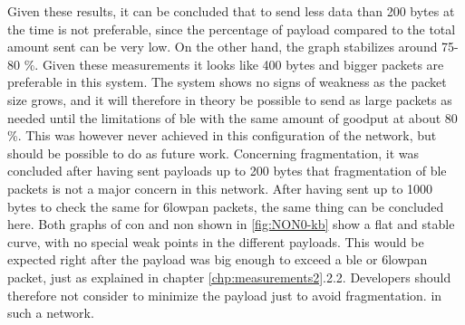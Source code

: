 \noindent Given these results, it can be concluded that to send less data than 200 bytes at the time is not preferable, since the percentage of \gls{payload} compared to the total amount sent can be very low. On the other hand, the graph stabilizes around 75-80 \%. Given these measurements it looks like 400 bytes and bigger packets are preferable in this system. The system shows no signs of weakness as the packet size grows, and it will therefore in theory be possible to send as large packets as needed until the limitations of \gls{ble} with the same amount of goodput at about 80 \%. This was however never achieved in this configuration of the network, but should be possible to do as future work. Concerning fragmentation, it was concluded after having sent \glspl{payload} up to 200 bytes that fragmentation of \gls{ble} packets is not a major concern in this network. After having sent up to 1000 bytes to check the same for \gls{6lowpan} packets, the same thing can be concluded here. Both graphs of \gls{con} and \gls{non} shown in \ref{fig:NON0-kb} show a flat and stable curve, with no special weak points in the different \glspl{payload}. This would be expected right after the \gls{payload} was big enough to exceed a \gls{ble} or \gls{6lowpan} packet, just as explained in chapter \ref{chp:measurements2}.2.2. Developers should therefore not consider to minimize the \gls{payload} just to avoid fragmentation.  in such a network. 











